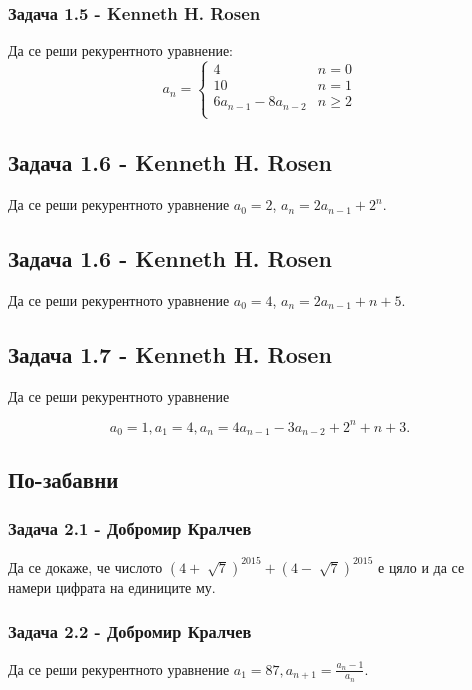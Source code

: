 \documentclass[12pt]{article}
\begin{document}
\subsubsection*{Задача 1.5 - Kenneth H. Rosen}
Да се реши рекурентното уравнение:
\begin{equation*}
    a_n = \begin{cases}
        4 & n = 0 \\
        10 & n = 1 \\
        6a_{n-1} - 8a_{n-2}  & n \geq 2 \\
    \end{cases}
\end{equation*}

\subsection*{Задача 1.6 - Kenneth H. Rosen}
Да се реши рекурентното уравнение $a_0 = 2$, $a_n = 2a_{n-1} + 2^n$.
\subsection*{Задача 1.6 - Kenneth H. Rosen}
Да се реши рекурентното уравнение $a_0 = 4$, $a_n = 2a_{n-1} + n + 5$.
\subsection*{Задача 1.7 - Kenneth H. Rosen}
Да се реши рекурентното уравнение 

\begin{equation*}
    a_0 = 1, a_1 = 4, a_n = 4a_{n-1} - 3a_{n-2} + 2^n + n + 3.
\end{equation*}

\subsection*{По-забавни}
\subsubsection*{Задача 2.1 - Добромир Кралчев}
Да се докаже, че числото $(4 + \sqrt[]{7})^{2015} + (4 - \sqrt[]{7})^{2015}$ е цяло и да се намери цифрата на единиците му. 
\subsubsection*{Задача 2.2 - Добромир Кралчев}
Да се реши рекурентното уравнение $a_1 = 87, a_{n+1} = \frac{a_n - 1}{a_n}$.
\end{document}
